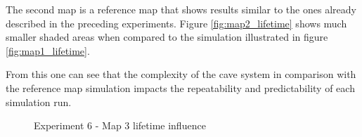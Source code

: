The second map is a reference map that shows results similar to the ones already described in the preceding experiments.
Figure \ref{fig:map2_lifetime} shows much smaller shaded areas when compared to the simulation illustrated in figure \ref{fig:map1_lifetime}.

From this one can see that the complexity of the cave system in comparison with the reference map simulation impacts the repeatability and predictability of each simulation run.

\begin{figure}[H]
    \centering

    \hspace*{\fill}

    \hspace*{\fill}

    \caption{Experiment 6 - Map 3 lifetime influence}\label{fig:map3_lifetime}
\end{figure}


